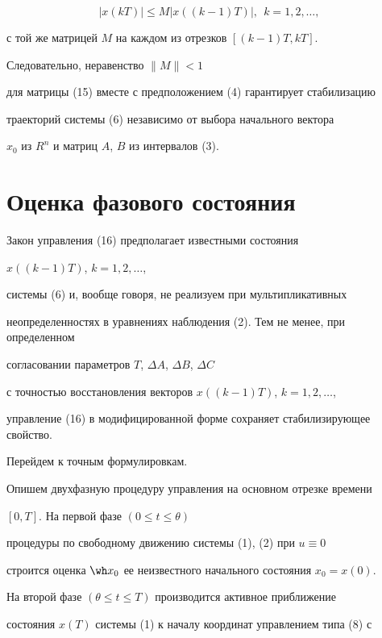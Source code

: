 $$


|x(kT)| \le M |x((k-1)T)|, \ \ k=1,2, \dotsc,


$$


с той же матрицей $M$ на каждом из отрезков $[(k-1)T, kT]$.





Следовательно, неравенство $\|M \| < 1$


для матрицы (15) вместе с предположением (4) гарантирует стабилизацию


траекторий системы (6) независимо от выбора начального вектора


$x_0$ из $R^n$ и матриц $A$, $B$ из интервалов (3).





\section{Оценка фазового состояния}





Закон управления (16) предполагает известными состояния


$x((k-1)T)$, $k=1,2,\dotsc$,


системы (6) и, вообще говоря, не реализуем при мультипликативных


неопределенностях в уравнениях наблюдения (2). Тем не менее, при определенном


согласовании параметров $T$, $\Delta A$, $\Delta B$, $\Delta C$


с точностью восстановления векторов $x((k-1)T)$, $k=1,2,\dotsc$,


управление (16) в модифицированной форме сохраняет стабилизирующее свойство.


Перейдем к точным формулировкам.





Опишем двухфазную процедуру управления на основном отрезке времени


$[0,T]$. На первой фазе $(0 \le t \le \theta) $


процедуры по свободному движению системы (1), (2) при $u \equiv 0$


строится оценка $\wh x_0$ ее неизвестного начального состояния $x_0=x(0)$.


На второй фазе $(\theta \le t \le T)$ производится активное приближение


состояния $x(T)$ системы (1) к началу координат управлением типа (8) с


